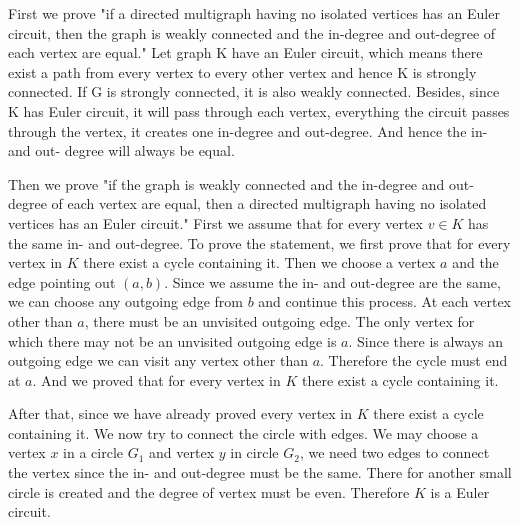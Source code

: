 \documentclass[11pt]{article}
\begin{document}
\newpage
First we prove "if a directed multigraph having no isolated vertices has an Euler circuit, then the graph is weakly connected and the in-degree and out-degree of each vertex are equal." Let graph K have an Euler circuit, which means there exist a path from every vertex to every other vertex and hence K is strongly connected. If G is strongly connected, it is also weakly connected. Besides, since K has Euler circuit, it will pass through each vertex, everything the circuit passes through the vertex, it creates one in-degree and out-degree. And hence the in- and out- degree will always be equal.



Then we prove "if the graph is weakly connected and the in-degree and out-degree of each vertex are equal, then a directed multigraph having no isolated vertices has an Euler circuit." First we assume that for every vertex $v \in K$ has the same in- and out-degree. To prove the statement, we first prove that for every vertex in $K$ there exist a cycle containing it. Then we choose a vertex $a$ and the edge pointing out $(a, b)$. Since we assume the in- and out-degree are the same, we can choose any outgoing edge from $b$ and continue this process.
At each vertex other than $a$, there must be an unvisited outgoing edge. The only vertex for which there may not be an unvisited outgoing edge is $a$. Since there is always an outgoing edge we can visit any vertex other than $a$. Therefore the cycle must end at $a$. And we proved that for every vertex in $K$ there exist a cycle containing it.

After that, since we have already proved every vertex in $K$ there exist a cycle containing it. We now try to connect the circle with edges. We may choose a vertex $x$ in a circle $G_1$ and vertex $y$ in circle $G_2$, we need two edges to connect the vertex since the in- and out-degree must be the same. There for another small circle is created and the degree of vertex must be even. Therefore $K$ is a Euler circuit. 
\end{document}
